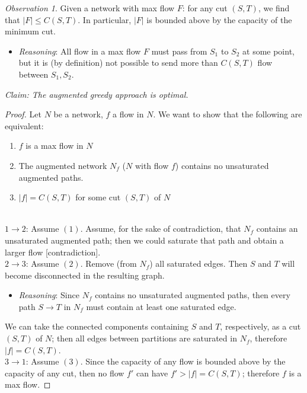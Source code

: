 \documentclass[12pt]{extarticle}
\theoremstyle{definition}
\theoremstyle{remark}
\newtheorem*{observation}{Observation}
\begin{document}
\begin{observation}
    Given a network with max flow $F$: for any cut $(S,T)$, we find that $|F|\leq C(S,T)$. In particular, $|F|$ is bounded above by the capacity of the minimum cut.\begin{itemize}
        \item \textit{Reasoning}: All flow in a max flow $F$ must pass from $S_1$ to $S_2$ at some point, but it is (by definition) not possible to send more than $C(S,T)$ flow between $S_1,S_2$.
    \end{itemize}
\end{observation}

\noindent\textit{}

\noindent\textit{Claim: The augmented greedy approach is optimal.}
\begin{proof}
Let $N$ be a network, $f$ a flow in $N$. We want to show that the following are equivalent: \begin{enumerate}
    \item $f$ is a max flow in $N$
    \item The augmented network $N_f$ ($N$ with flow $f$) contains no unsaturated augmented paths.
    \item $|f|=C(S,T)$ for some cut $(S,T)$ of $N$
\end{enumerate}

~\\
\noindent$1\to 2$: Assume $(1)$. Assume, for the sake of contradiction, that $N_f$ contains an unsaturated augmented path; then we could saturate that path and obtain a larger flow [contradiction].\\

\noindent$2\to 3$: Assume $(2)$. Remove (from $N_f$) all saturated edges. Then $S$ and $T$ will become disconnected in the resulting graph. \begin{itemize}
    \item \textit{Reasoning}: Since $N_f$ contains no unsaturated augmented paths, then every path $S\to T$ in $N_f$ must contain at least one saturated edge.
\end{itemize}

We can take the connected components containing $S$ and $T$, respectively, as a cut $(S,T)$ of $N$; then all edges between partitions are saturated in $N_f$, therefore $|f|=C(S,T)$.\\

\noindent$3\to 1$: Assume $(3)$. Since the capacity of any flow is bounded above by the capacity of any cut, then no flow $f'$ can have $f'>|f|=C(S,T)$; therefore $f$ is a max flow.
\end{proof}
\end{document}

